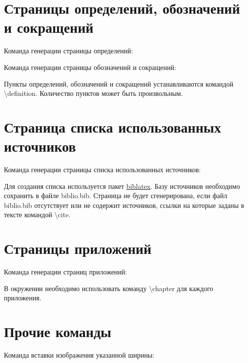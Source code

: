 \documentclass{bmstu}
\begin{document}
\section{Страницы определений, обозначений и сокращений}
Команда генерации страницы определений:

Команда генерации страницы обозначений и сокращений:

Пункты определений, обозначений и сокращений устанавливаются командой {\ttfamily \textbackslash definition}. Количество пунктов может быть произвольным.

\section{Страница списка использованных источников}
Команда генерации страницы списка использованных источников:

Для создания списка используется пакет \href{https://www.ctan.org/pkg/biblatex}{biblatex}. Базу источников необходимо сохранить в файле {\ttfamily biblio.bib}. Страница не будет сгенерирована, если файл {\ttfamily biblio.bib} отсутствует или не содержит источников, ссылки на которые заданы в тексте командой {\ttfamily \textbackslash cite}.

\section{Страницы приложений}

Команда генерации страниц приложений:

В окружении необходимо использовать команду {\ttfamily \textbackslash chapter} для каждого приложения.

\section{Прочие команды}

Команда вставки изображения указанной ширины:
\end{document}
